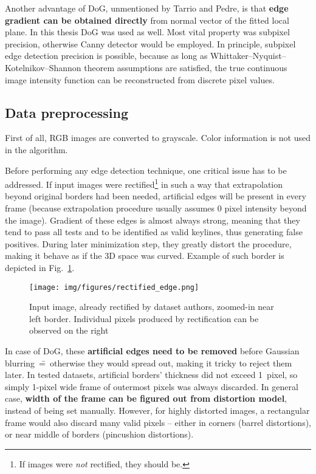 Another advantage of DoG, unmentioned by Tarrio and Pedre, is that \textbf{edge gradient can be obtained directly} from normal vector of the fitted local plane. In this thesis DoG was used as well. Most vital property was subpixel precision, otherwise Canny detector \cite{canny} would be employed. In principle, subpixel edge detection precision is possible, because as long as Whittaker–Nyquist–Kotelnikov–Shannon theorem assumptions are satisfied, the true continuous image intensity function can be reconstructed from discrete pixel values.

\subsection{Data preprocessing}

First of all, RGB images are converted to grayscale. Color information is not used in the algorithm.

Before performing any edge detection technique, one critical issue has to be addressed. If input images were rectified\footnote{If images were \textit{not} rectified, they should be.} in such a way that extrapolation beyond original borders had been needed, artificial edges will be present in every frame (because extrapolation procedure usually assumes 0 pixel intensity beyond the image). Gradient of these edges is almost always strong, meaning that they tend to pass all tests and to be identified as valid keylines, thus generating false positives. During later minimization step, they greatly distort the procedure, making it behave as if the 3D space was curved. Example of such border is depicted in Fig.~\ref{fig:rectifcy_border}.

\begin{figure}[ht]
	\centering\texttt{[image: img/figures/rectified\_edge.png]}
	\caption{ Input image, already rectified by dataset authors, zoomed-in near left border. Individual pixels produced by rectification can be observed on the right }
	\label{fig:rectifcy_border}
\end{figure}

In case of DoG, these \textbf{artificial edges need to be removed} before Gaussian blurring~\==~otherwise they would spread out, making it tricky to reject them later. In tested datasets, artificial borders' thickness did not exceed 1~pixel, so simply 1-pixel wide frame of outermost pixels was always discarded. In general case, \textbf{width of the frame can be figured out from distortion model}, instead of being set manually. However, for highly distorted images, a rectangular frame would also discard many valid pixels -- either in corners (barrel distortions), or near middle of borders (pincushion distortions).

